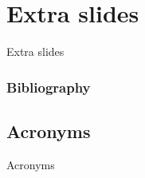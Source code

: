 
\section{Extra slides}

\begin{frame}
\begin{block}{Extra slides}

\end{block}
\end{frame}


\begin{frame}
\frametitle{Bibliography}
\tiny


\end{frame}

\subsection*{Acronyms}
\begin{frame}{Acronyms}



\end{frame}

